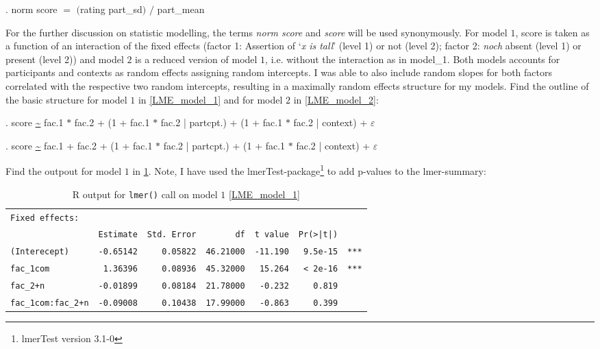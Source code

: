 \documentclass[output=paper,
modfonts
]{langscibook}
\begin{document}
\ex. norm score $=$ $($rating \textminus part\_sd$)$ $/$ part\_mean

For the further discussion on statistic modelling, the terms \textit{norm score} and \textit{score} will be used synonymously. For model $1$, score is taken as a function of an interaction of the fixed effects (factor 1: Assertion of `\textit{x is tall}' (level 1) or not (level 2); factor 2: \textit{noch} absent (level 1) or present (level 2)) and model $2$ is a reduced version of model $1$, i.e. without the interaction as in model\_1. Both models accounts for participants and contexts as random effects assigning random intercepts. I was able to also include random slopes for both factors correlated with the respective two random intercepts, resulting in a maximally random effects structure for my models. Find the outline of the basic structure for model $1$ in \ref{LME_model_1} and for model $2$ in \ref{LME_model_2}:

\ex. \small score \url{~} fac.1 $*$ fac.2 + (1 + fac.1 $*$ fac.2 | partcpt.) + (1 + fac.1 $*$ fac.2 | context) + $\varepsilon$ \label{LME_model_1}

\ex. \small score \url{~} fac.1 + fac.2 + (1 + fac.1 $*$ fac.2 | partcpt.) + (1 + fac.1 $*$ fac.2 | context) + $\varepsilon$ \label{LME_model_2}

Find the outpout for model $1$ in \ref{R_output_model_1}. Note, I have used the lmerTest-package\footnote{lmerTest version 3.1-0} \citep{lmerTest} to add p-values to the lmer-summary:


\begin{table}[H]\scriptsize
\begin{tabular}{lrrrrrl}
\texttt{Fixed effects:}      &              &                &               &               &               & \\
                        & \texttt{Estimate} & \texttt{Std. Error} & \texttt{df}        & \texttt{t value}   & \texttt{Pr(>|t|)}  & \\
\texttt{(Interecept)}        & \texttt{-0.65142} & \texttt{0.05822}    & \texttt{46.21000}  & \texttt{-11.190}   & \texttt{9.5e-15}   & \texttt{***}\\
\texttt{fac\_1com}           &  \texttt{1.36396} & \texttt{0.08936}    & \texttt{45.32000}  &  \texttt{15.264}   & \texttt{< 2e-16}   & \texttt{***}\\
\texttt{fac\_2+n}            & \texttt{-0.01899} & \texttt{0.08184}    & \texttt{21.78000}  &  \texttt{-0.232}   & \texttt{0.819}     & \\
\texttt{fac\_1com:fac\_2+n}  & \texttt{-0.09008} & \texttt{0.10438}    & \texttt{17.99000}  &  \texttt{-0.863}   & \texttt{0.399}     & \\
\end{tabular}
\caption{R output for \texttt{lmer()} call on model $1$ \ref{LME_model_1}}
\label{R_output_model_1}
\end{table}
\end{document}

